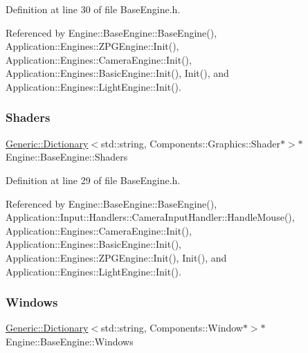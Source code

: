 Definition at line 30 of file Base\+Engine.\+h.



Referenced by Engine\+::\+Base\+Engine\+::\+Base\+Engine(), Application\+::\+Engines\+::\+Z\+P\+G\+Engine\+::\+Init(), Application\+::\+Engines\+::\+Camera\+Engine\+::\+Init(), Application\+::\+Engines\+::\+Basic\+Engine\+::\+Init(), Init(), and Application\+::\+Engines\+::\+Light\+Engine\+::\+Init().

\mbox{\label{classEngine_1_1BaseEngine_a2582dee3f73da82bb422b43317b85e3b}} 
\subsubsection{\texorpdfstring{Shaders}{Shaders}}
{\footnotesize\ttfamily \mbox{\hyperlink{classGeneric_1_1Dictionary}{Generic\+::\+Dictionary}}$<$std\+::string, Components\+::\+Graphics\+::\+Shader$\ast$$>$$\ast$ Engine\+::\+Base\+Engine\+::\+Shaders\hspace{0.3cm}{\ttfamily [inherited]}}



Definition at line 29 of file Base\+Engine.\+h.



Referenced by Engine\+::\+Base\+Engine\+::\+Base\+Engine(), Application\+::\+Input\+::\+Handlers\+::\+Camera\+Input\+Handler\+::\+Handle\+Mouse(), Application\+::\+Engines\+::\+Camera\+Engine\+::\+Init(), Application\+::\+Engines\+::\+Basic\+Engine\+::\+Init(), Application\+::\+Engines\+::\+Z\+P\+G\+Engine\+::\+Init(), Init(), and Application\+::\+Engines\+::\+Light\+Engine\+::\+Init().

\mbox{\label{classEngine_1_1BaseEngine_a4a1a4c4dae052e66ecc4f326eeed4d33}} 
\subsubsection{\texorpdfstring{Windows}{Windows}}
{\footnotesize\ttfamily \mbox{\hyperlink{classGeneric_1_1Dictionary}{Generic\+::\+Dictionary}}$<$std\+::string, Components\+::\+Window$\ast$$>$$\ast$ Engine\+::\+Base\+Engine\+::\+Windows\hspace{0.3cm}{\ttfamily [inherited]}}



